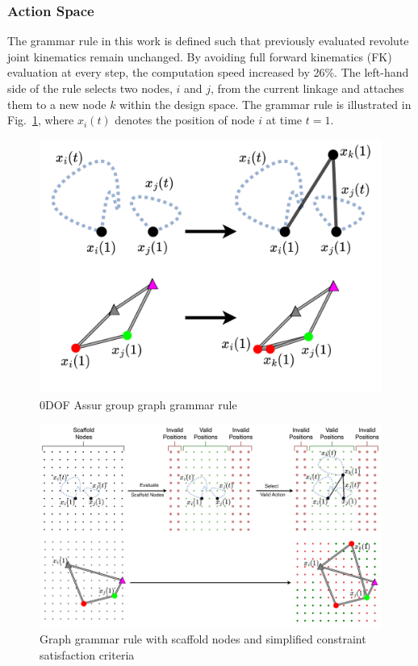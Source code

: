\subsubsection{Action Space}\label{sec:action-rep} The grammar rule in this work is defined such that previously evaluated revolute joint kinematics remain unchanged. By avoiding full forward kinematics (FK) evaluation at every step, the computation speed increased by 26\%. The left-hand side of the rule selects two nodes, \( i \) and \( j \), from the current linkage and attaches them to a new node \( k \) within the design space. The grammar rule is illustrated in Fig.~\ref{fig:assur_group}, where \( x_i(t) \) denotes the position of node \( i \) at time \( t = 1 \).

\begin{figure}
    \centering
    \includegraphics[width=0.65\linewidth]{03_figure_grammar_rule.png}
    \caption{0DOF Assur group graph grammar rule}
    \label{fig:assur_group}
\end{figure}
\begin{figure}
    \centering
    \includegraphics[width=\linewidth]{04_figure_scaffold_nodes.png}
    \caption{Graph grammar rule with scaffold nodes and simplified constraint satisfaction criteria}
    \label{fig:scaffold-nodes}
\end{figure}

